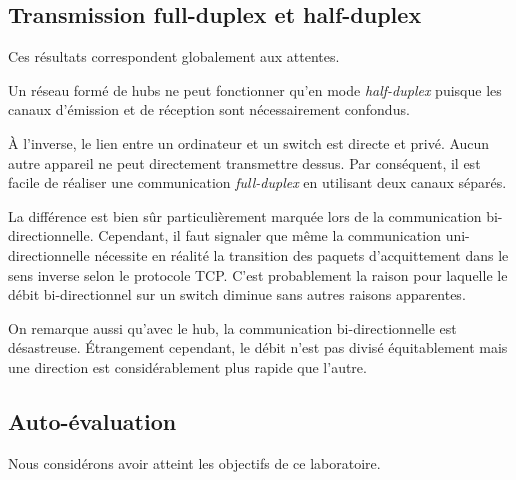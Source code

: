 \documentclass[11pt,a4paper]{article}
\begin{document}
\subsection{Transmission full-duplex et half-duplex}

Ces résultats correspondent globalement aux attentes.

Un réseau formé de hubs ne peut fonctionner qu'en mode \textit{half-duplex} puisque les canaux d'émission et de réception sont nécessairement confondus.

À l'inverse, le lien entre un ordinateur et un switch est directe et privé. Aucun autre appareil ne peut directement transmettre dessus. Par conséquent, il est facile de réaliser une communication \textit{full-duplex} en utilisant deux canaux séparés.

La différence est bien sûr particulièrement marquée lors de la communication bi-directionnelle. Cependant, il faut signaler que même la communication uni-directionnelle nécessite en réalité la transition des paquets d'acquittement dans le sens inverse selon le protocole TCP. C'est probablement la raison pour laquelle le débit bi-directionnel sur un switch diminue sans autres raisons apparentes.

On remarque aussi qu'avec le hub, la communication bi-directionnelle est désastreuse. Étrangement cependant, le débit n'est pas divisé équitablement mais une direction est considérablement plus rapide que l'autre.

\subsection{Auto-évaluation}

Nous considérons avoir atteint les objectifs de ce laboratoire.
\end{document}

